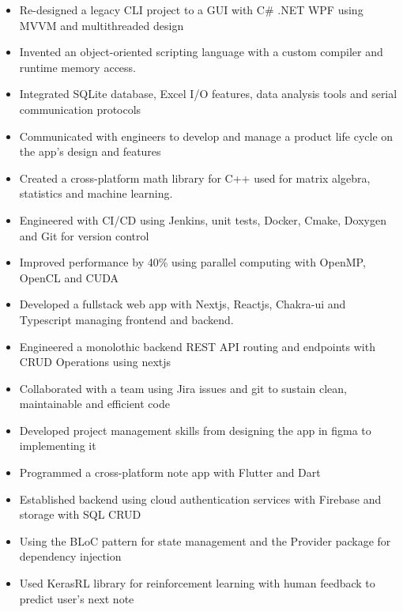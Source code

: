 \documentclass[11pt,a4paper,ragged2e]{altacv}
\begin{document}
\begin{paracol}{1}

\begin{itemize}
\item Re-designed a legacy CLI project to a GUI with C\# .NET WPF using MVVM and multithreaded design
\item Invented an object-oriented scripting language with a custom compiler and runtime memory access.
\item Integrated SQLite database, Excel I/O features, data analysis tools and serial communication protocols 
\item Communicated with engineers to develop and manage a product life cycle on the app's design and features
\end{itemize}

\tightdivider

\begin{itemize}
\item Created a cross-platform math library for C++ used for matrix algebra, statistics and machine learning.
\item Engineered with CI/CD using Jenkins, unit tests, Docker, Cmake, Doxygen and Git for version control
\item Improved performance by 40\% using parallel computing with OpenMP, OpenCL and CUDA
\end{itemize}

\begin{itemize}
\item Developed a fullstack web app with Nextjs, Reactjs, Chakra-ui and Typescript managing frontend and backend.
\item Engineered a monolothic backend REST API routing and endpoints with CRUD Operations using nextjs 
\item Collaborated with a team using Jira issues and git to sustain clean, maintainable and efficient code
\item Developed project management skills from designing the app in figma to implementing it 
\end{itemize}

\tightdivider


\begin{itemize}
\item Programmed a cross-platform note app with Flutter and Dart
\item Established backend using cloud authentication services with Firebase and storage with SQL CRUD 
\item Using the BLoC pattern for state management and the Provider package for dependency injection
\item Used KerasRL library for reinforcement learning with human feedback to predict user's next note
\end{itemize}
\tightdivider


\end{paracol}
\end{document}
